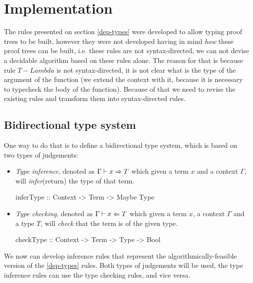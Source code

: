 \chapter{Implementation}

The rules presented on section \ref{dep-types} were developed to allow typing proof trees to be built, however they were not developed having in mind \emph{how} these proof trees can be built, i.e. these rules are not syntax-directed, we can not devise a decidable algorithm based on these rules alone.
The reason for that is because rule $T-Lambda$ is not syntax-directed, it is not clear what is the type of the argument of the function (we extend the context with it, because it is necessary to typecheck the body of the function).
Because of that we need to revise the existing rules and transform them into syntax-directed rules.

\section{Bidirectional type system}

One way to do that is to define a bidirectional type system, which is based on two types of judgements:
\begin{itemize}
       \item \emph{Type inference}, denoted as $\Gamma \vdash x \Rightarrow T$ which given a term $x$ and a context $\Gamma$, will \emph{infer}(return) the type of that term.
             \begin{haskell}
                    inferType :: Context -> Term -> Maybe Type
             \end{haskell}
       \item \emph{Type checking}, denoted as $\Gamma \vdash x \Leftarrow T$ which given a term $x$, a context $\Gamma$ and a type $T$, will \emph{check} that the term is of the given type.
             \begin{haskell}
                    checkType :: Context -> Term -> Type -> Bool
             \end{haskell}
\end{itemize}

We now can develop inference rules that represent the algorithmically-feasible version of the \ref{dep-types} rules. Both types of judgements will be used, the type inference rules can use the type checking rules, and vice versa.

